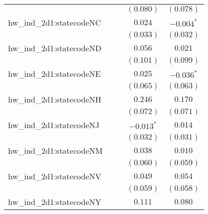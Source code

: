 \begin{center}
\begin{longtable}{l c c c c}
                         &                       &                       & $(0.080)$             & $(0.078)$             \\
hw\_ind\_2d1:statecodeNC &                       &                       & $0.024$               & $\mathbf{-0.004}^{*}$ \\
                         &                       &                       & $(0.033)$             & $(0.032)$             \\
hw\_ind\_2d1:statecodeND &                       &                       & $0.056$               & $0.021$               \\
                         &                       &                       & $(0.101)$             & $(0.099)$             \\
hw\_ind\_2d1:statecodeNE &                       &                       & $0.025$               & $\mathbf{-0.036}^{*}$ \\
                         &                       &                       & $(0.065)$             & $(0.063)$             \\
hw\_ind\_2d1:statecodeNH &                       &                       & $0.246$               & $0.170$               \\
                         &                       &                       & $(0.072)$             & $(0.071)$             \\
hw\_ind\_2d1:statecodeNJ &                       &                       & $\mathbf{-0.013}^{*}$ & $0.014$               \\
                         &                       &                       & $(0.032)$             & $(0.031)$             \\
hw\_ind\_2d1:statecodeNM &                       &                       & $0.038$               & $0.010$               \\
                         &                       &                       & $(0.060)$             & $(0.059)$             \\
hw\_ind\_2d1:statecodeNV &                       &                       & $0.049$               & $0.054$               \\
                         &                       &                       & $(0.059)$             & $(0.058)$             \\
hw\_ind\_2d1:statecodeNY &                       &                       & $0.111$               & $0.080$               \\

\end{longtable}
\end{center}

